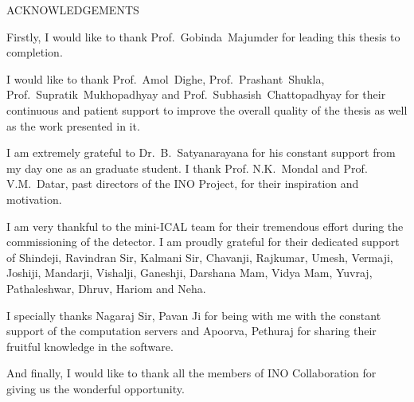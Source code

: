 
\begin{center}
  \vspace*{2em}
  \large
  \uppercase{Acknowledgements}
\end{center}

\normalsize

{\rm Firstly, I would like to thank Prof.~Gobinda~Majumder for leading
  this thesis to completion.}

{\rm I would like to thank Prof.~Amol~Dighe, Prof.~Prashant~Shukla,
  Prof.~Supratik~Mukhopadhyay and Prof.~Subhasish~Chattopadhyay
  for their continuous and patient support to improve the overall
  quality of the thesis as well as the work presented in it.}

{\rm I am extremely grateful to Dr.~B.~Satyanarayana for his constant
  support from my day one as an graduate student.
  I thank Prof. N.K.~Mondal and Prof. V.M.~Datar, past directors of
  the INO Project, for their inspiration and motivation.}

{\rm I am very thankful to the mini-ICAL team for their tremendous
  effort during the commissioning of the detector. I am proudly
  grateful for their dedicated support of Shindeji, Ravindran Sir,
  Kalmani Sir, Chavanji, Rajkumar, Umesh, Vermaji, Joshiji, Mandarji,
  Vishalji, Ganeshji, Darshana Mam, Vidya Mam, Yuvraj, Pathaleshwar,
  Dhruv, Hariom and Neha.}

{\rm I specially thanks Nagaraj Sir, Pavan Ji for being with me
  with the constant support of the computation servers and Apoorva,
  Pethuraj for sharing their fruitful knowledge in the software.}

{\rm And finally, I would like to thank all the members of
  INO Collaboration for giving us the wonderful opportunity.}
